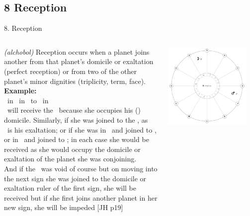 \subsection{8 Reception}
\begin{frame}[t]{8. Reception}
\small
\begin{columns}[T, onlytextwidth]
\textsl{(alchobol)} Reception occurs when a planet joins another from that planet's domicile or exaltation (perfect reception) or from two of the other planet's minor dignities (triplicity, term, face). \\

\vspace{0.25cm}
\textbf{Example:} \\
\ul
\Moon\ in \Aries\ in \Trine\ to \Mars\ in \Sagittarius \\

\vspace{0.25cm}
\Mars\ will receive the \Moon\ because she occupies his (\Mars) domicile. Similarly, if she was joined to the \Sun, as \Aries\ is his exaltation; or if she was in \Taurus\ and joined to \Venus, or in \Gemini\ and joined to \Mercury; in each case she would be received as she would occupy the domicile or exaltation of the planet she was conjoining. \\

\vspace{0.25cm}
And if the \Moon\ was void of course but on moving into the next sign she was joined to the domicile or exaltation ruler of the first sign, she will be received but if she first joins another planet in her new sign, she will be impeded [JH p19]


\begin{center}
{\includegraphics[width=0.9\textwidth]{charts/65-reception}} \\
\end{center}
\end{columns}
\end{frame}
